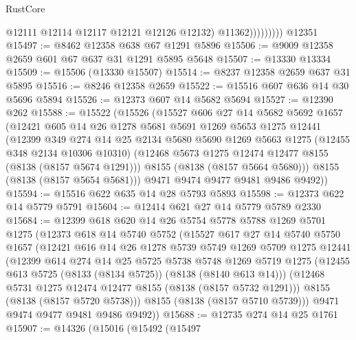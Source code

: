 \begin{lexlean}{RustCore}
\begin{coremodule}
                        @12111
                        @12114
                        @12117
                        @12121
                        @12126
                        @12132)
                      @11362)))))))))
    @12351
@15497 := @8462 @12358 @638 @67 @1291 @5896
@15506 := @9009 @12358 @2659 @601 @67 @637 @31 @1291 @5895 @5648
@15507 := @13330 @13334
@15509 := @15506 (@13330 @15507)
@15514 := @8237 @12358 @2659 @637 @31 @5895
@15516 := @8246 @12358 @2659
@15522 := @15516 @607 @636 @14 @30 @5696 @5894
@15526 := @12373 @607 @14 @5682 @5694
@15527 := @12390 @262
@15588 := @15522
    (@15526
      (@15527
        @606
        @27
        @14
        @5682
        @5692
        @1657
        (@12421
          @605
          @14
          @26
          @1278
          @5681
          @5691
          @1269
          @5653
          @1275
          @12441
          (@12399
            @349
            @274
            @14
            @25
            @2134
            @5680
            @5690
            @1269
            @5663
            @1275
            (@12455 @348 @2134 @10306 @10310)
            (@12468 @5673 @1275 @12474 @12477 @8155 (@8138 (@8157 @5674 @1291)))
            @8155
            (@8138 (@8157 @5664 @5680)))
          @8155
          (@8138 (@8157 @5654 @5681)))
        @9471
        @9474
        @9477
        @9481
        @9486
        @9492))
@15594 := @15516 @622 @635 @14 @28 @5793 @5893
@15598 := @12373 @622 @14 @5779 @5791
@15604 := @12414 @621 @27 @14 @5779 @5789 @2330
@15684 := @12399
    @618
    @620
    @14
    @26
    @5754
    @5778
    @5788
    @1269
    @5701
    @1275
    (@12373
      @618
      @14
      @5740
      @5752
      (@15527
        @617
        @27
        @14
        @5740
        @5750
        @1657
        (@12421
          @616
          @14
          @26
          @1278
          @5739
          @5749
          @1269
          @5709
          @1275
          @12441
          (@12399
            @614
            @274
            @14
            @25
            @5725
            @5738
            @5748
            @1269
            @5719
            @1275
            (@12455 @613 @5725 (@8133 (@8134 @5725)) (@8138 (@8140 @613 @14)))
            (@12468 @5731 @1275 @12474 @12477 @8155 (@8138 (@8157 @5732 @1291)))
            @8155
            (@8138 (@8157 @5720 @5738)))
          @8155
          (@8138 (@8157 @5710 @5739)))
        @9471
        @9474
        @9477
        @9481
        @9486
        @9492))
@15688 := @12735 @274 @14 @25 @1761
@15907 := @14326
    (@15016
      (@15492
        (@15497

\end{coremodule}
\end{lexlean}
